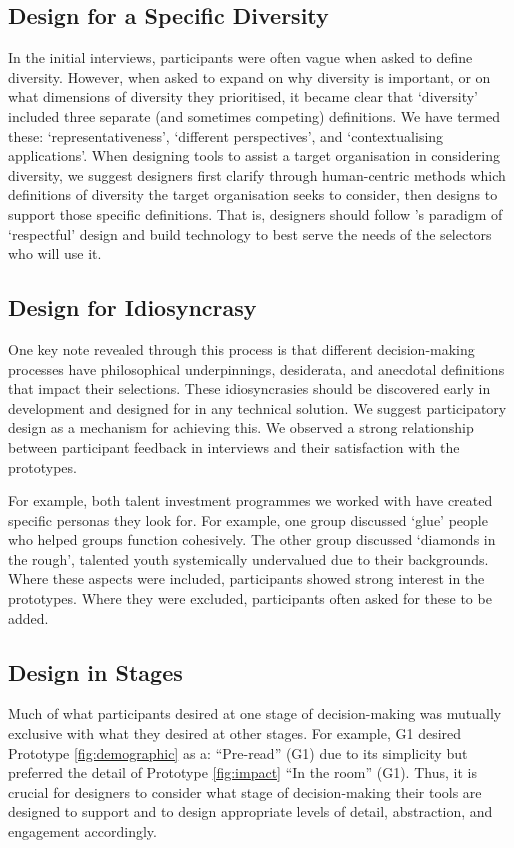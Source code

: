 \subsection{Design for a Specific Diversity}
In the initial interviews, participants were often vague when asked to define diversity. However, when asked to expand on why diversity is important, or on what dimensions of diversity they prioritised, it became clear that `diversity' included three separate (and sometimes competing) definitions. We have termed these: `representativeness', `different perspectives', and `contextualising applications'. When designing tools to assist a target organisation in considering diversity, we suggest designers first clarify through human-centric methods which definitions of diversity the target organisation seeks to consider, then designs to support those specific definitions. That is, designers should follow \textcite{VanKleek_Seymour_Binns_Shadbolt_2018}'s paradigm of `respectful' design and build technology to best serve the needs of the selectors who will use it.

\subsection{Design for Idiosyncrasy}
One key note revealed through this process is that different decision-making processes have philosophical underpinnings, desiderata, and anecdotal definitions that impact their selections. These idiosyncrasies should be discovered early in development and designed for in any technical solution. We suggest participatory design as a mechanism for achieving this. We observed a strong relationship between participant feedback in interviews and their satisfaction with the prototypes.

For example, both talent investment programmes we worked with have created specific personas they look for. For example, one group discussed `glue' people who helped groups function cohesively. The other group discussed `diamonds in the rough', talented youth systemically undervalued due to their backgrounds. Where these aspects were included, participants showed strong interest in the prototypes. Where they were excluded, participants often asked for these to be added.

\subsection{Design in Stages}
Much of what participants desired at one stage of decision-making was mutually exclusive with what they desired at other stages. For example, G1 desired Prototype \ref{fig:demographic} as a: ``Pre-read'' (G1) due to its simplicity but preferred the detail of Prototype \ref{fig:impact} ``In the room'' (G1). Thus, it is crucial for designers to consider what stage of decision-making their tools are designed to support and to design appropriate levels of detail, abstraction, and engagement accordingly.

